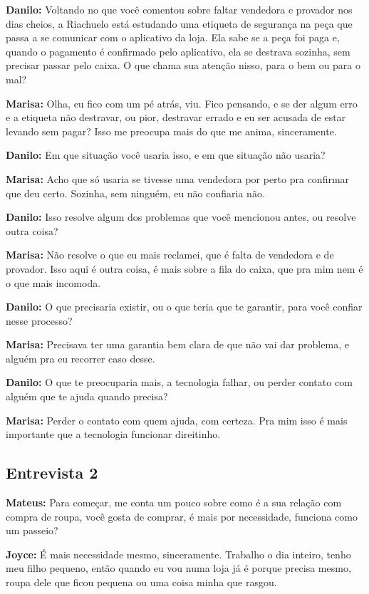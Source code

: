 \textbf{Danilo:} Voltando no que você comentou sobre faltar vendedora e provador nos dias cheios, a Riachuelo está estudando uma etiqueta de segurança na peça que passa a se comunicar com o aplicativo da loja. Ela sabe se a peça foi paga e, quando o pagamento é confirmado pelo aplicativo, ela se destrava sozinha, sem precisar passar pelo caixa. O que chama sua atenção nisso, para o bem ou para o mal?

\textbf{Marisa:} Olha, eu fico com um pé atrás, viu. Fico pensando, e se der algum erro e a etiqueta não destravar, ou pior, destravar errado e eu ser acusada de estar levando sem pagar? Isso me preocupa mais do que me anima, sinceramente.

\textbf{Danilo:} Em que situação você usaria isso, e em que situação não usaria?

\textbf{Marisa:} Acho que só usaria se tivesse uma vendedora por perto pra confirmar que deu certo. Sozinha, sem ninguém, eu não confiaria não.

\textbf{Danilo:} Isso resolve algum dos problemas que você mencionou antes, ou resolve outra coisa?

\textbf{Marisa:} Não resolve o que eu mais reclamei, que é falta de vendedora e de provador. Isso aqui é outra coisa, é mais sobre a fila do caixa, que pra mim nem é o que mais incomoda.

\textbf{Danilo:} O que precisaria existir, ou o que teria que te garantir, para você confiar nesse processo?

\textbf{Marisa:} Precisava ter uma garantia bem clara de que não vai dar problema, e alguém pra eu recorrer caso desse.

\textbf{Danilo:} O que te preocuparia mais, a tecnologia falhar, ou perder contato com alguém que te ajuda quando precisa?

\textbf{Marisa:} Perder o contato com quem ajuda, com certeza. Pra mim isso é mais importante que a tecnologia funcionar direitinho.


\subsection*{Entrevista 2}

\textbf{Mateus:} Para começar, me conta um pouco sobre como é a sua relação com compra de roupa, você gosta de comprar, é mais por necessidade, funciona como um passeio?

\textbf{Joyce:} É mais necessidade mesmo, sinceramente. Trabalho o dia inteiro, tenho meu filho pequeno, então quando eu vou numa loja já é porque precisa mesmo, roupa dele que ficou pequena ou uma coisa minha que rasgou.

